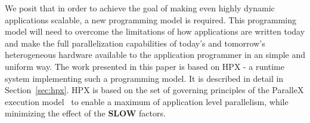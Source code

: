 \documentclass{sig-alternate}
\newcommand{\B}[1]{\textbf{#1}}
\newcommand{\F}[1]{\B{\textcolor{red}{FIXME: #1}}}
\newcommand{\upp}{\vspace*{-0.5em}}
\newcommand{\up}{\vspace*{-0.25em}}
\begin{document}

We posit that in order to achieve the goal of making even highly dynamic applications scalable,
a new programming model is required. This programming model will need to overcome the limitations of
how applications are written today and make the full parallelization capabilities of today's
and tomorrow's heterogeneous hardware available to the application programmer in an simple and uniform way.
The work presented in this paper is based on HPX - a runtime system implementing such a programming model.
It is described in detail in Section~\ref{sec:hpx}. HPX is based on the set of governing principles of the ParalleX
execution model~\cite{scaling_impaired_apps,heller_dataflow,tabbal} to enable a maximum of application level parallelism, while minimizing the effect of the
\B{SLOW} factors.
\end{document}
